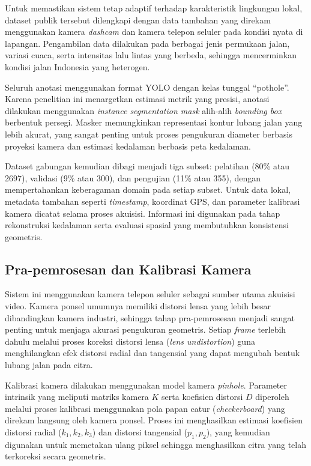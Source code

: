 \documentclass{iopjournal}
\begin{document}
Untuk memastikan sistem tetap adaptif terhadap karakteristik lingkungan lokal, dataset publik tersebut dilengkapi dengan data tambahan yang direkam menggunakan kamera \textit{dashcam} dan kamera telepon seluler pada kondisi nyata di lapangan. Pengambilan data dilakukan pada berbagai jenis permukaan jalan, variasi cuaca, serta intensitas lalu lintas yang berbeda, sehingga mencerminkan kondisi jalan Indonesia yang heterogen.

Seluruh anotasi menggunakan format YOLO dengan kelas tunggal “pothole”. Karena penelitian ini menargetkan estimasi metrik yang presisi, anotasi dilakukan menggunakan \textit{instance segmentation mask} alih-alih \textit{bounding box} berbentuk persegi. Masker memungkinkan representasi kontur lubang jalan yang lebih akurat, yang sangat penting untuk proses pengukuran diameter berbasis proyeksi kamera dan estimasi kedalaman berbasis peta kedalaman.

Dataset gabungan kemudian dibagi menjadi tiga subset: pelatihan (80\% atau 2697), validasi (9\% atau 300), dan pengujian (11\% atau 355), dengan mempertahankan keberagaman domain pada setiap subset. Untuk data lokal, metadata tambahan seperti \textit{timestamp}, koordinat GPS, dan parameter kalibrasi kamera dicatat selama proses akuisisi. Informasi ini digunakan pada tahap rekonstruksi kedalaman serta evaluasi spasial yang membutuhkan konsistensi geometris.

\subsection{Pra-pemrosesan dan Kalibrasi Kamera}
Sistem ini menggunakan kamera telepon seluler sebagai sumber utama akuisisi video. Kamera ponsel umumnya memiliki distorsi lensa yang lebih besar dibandingkan kamera industri, sehingga tahap pra-pemrosesan menjadi sangat penting untuk menjaga akurasi pengukuran geometris. Setiap \textit{frame} terlebih dahulu melalui proses koreksi distorsi lensa (\textit{lens undistortion}) guna menghilangkan efek distorsi radial dan tangensial yang dapat mengubah bentuk lubang jalan pada citra.

Kalibrasi kamera dilakukan menggunakan model kamera \textit{pinhole}. Parameter intrinsik yang meliputi matriks kamera $K$ serta koefisien distorsi $D$ diperoleh melalui proses kalibrasi menggunakan pola papan catur (\textit{checkerboard}) yang direkam langsung oleh kamera ponsel. Proses ini menghasilkan estimasi koefisien distorsi radial ($k_1, k_2, k_3$) dan distorsi tangensial ($p_1, p_2$), yang kemudian digunakan untuk memetakan ulang piksel sehingga menghasilkan citra yang telah terkoreksi secara geometris.
\end{document}
